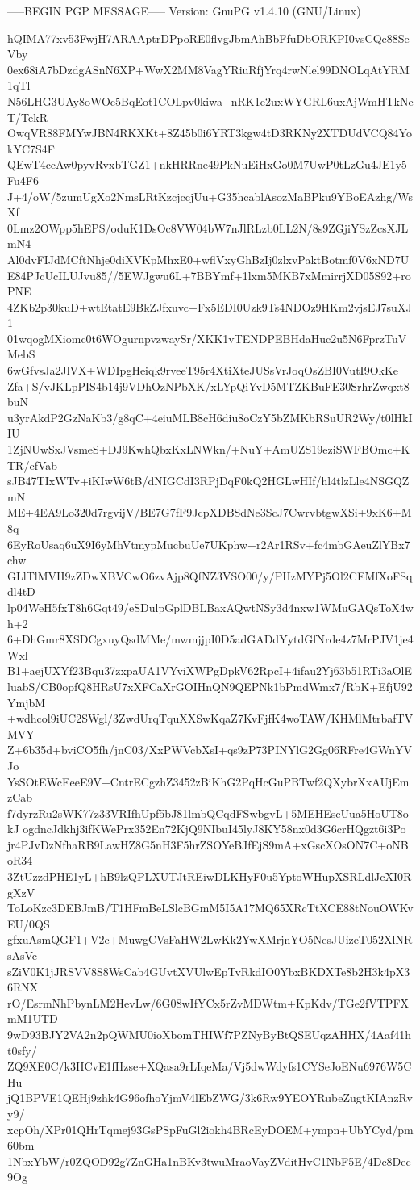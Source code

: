 -----BEGIN PGP MESSAGE-----
Version: GnuPG v1.4.10 (GNU/Linux)

hQIMA77xv53FwjH7ARAAptrDPpoRE0flvgJbmAhBbFfuDbORKPI0vsCQc88SeVby
0ex68iA7bDzdgASnN6XP+WwX2MM8VagYRiuRfjYrq4rwNlel99DNOLqAtYRM1qTl
N56LHG3UAy8oWOc5BqEot1COLpv0kiwa+nRK1e2uxWYGRL6uxAjWmHTkNeT/TekR
OwqVR88FMYwJBN4RKXKt+8Z45b0i6YRT3kgw4tD3RKNy2XTDUdVCQ84YokYC7S4F
QEwT4ccAw0pyvRvxbTGZ1+nkHRRne49PkNuEiHxGo0M7UwP0tLzGu4JE1y5Fu4F6
J+4/oW/5zumUgXo2NmsLRtKzcjccjUu+G35hcablAsozMaBPku9YBoEAzhg/WsXf
0Lmz2OWpp5hEPS/oduK1DsOc8VW04bW7nJlRLzb0LL2N/8s9ZGjiYSzZcsXJLmN4
Al0dvFIJdMCftNhje0diXVKpMhxE0+wflVxyGhBzIj0zlxvPaktBotmf0V6xND7U
E84PJcUcILUJvu85//5EWJgwu6L+7BBYmf+1lxm5MKB7xMmirrjXD05S92+roPNE
4ZKb2p30kuD+wtEtatE9BkZJfxuvc+Fx5EDI0Uzk9Ts4NDOz9HKm2vjsEJ7suXJ1
01wqogMXiomc0t6WOgurnpvzwaySr/XKK1vTENDPEBHdaHuc2u5N6FprzTuVMebS
6wGfvsJa2JlVX+WDIpgHeiqk9rveeT95r4XtiXteJUSsVrJoqOsZBI0VutI9OkKe
Zfa+S/vJKLpPIS4b14j9VDhOzNPbXK/xLYpQiYvD5MTZKBuFE30SrhrZwqxt8buN
u3yrAkdP2GzNaKb3/g8qC+4eiuMLB8cH6diu8oCzY5bZMKbRSuUR2Wy/t0lHkIIU
1ZjNUwSxJVsmeS+DJ9KwhQbxKxLNWkn/+NuY+AmUZS19eziSWFBOmc+KTR/cfVab
sJB47TIxWTv+iKIwW6tB/dNIGCdI3RPjDqF0kQ2HGLwHIf/hl4tlzLle4NSGQZmN
ME+4EA9Lo320d7rgvijV/BE7G7fF9JcpXDBSdNe3ScJ7CwrvbtgwXSi+9xK6+M8q
6EyRoUsaq6uX9I6yMhVtmypMucbuUe7UKphw+r2Ar1RSv+fc4mbGAeuZlYBx7chw
GLlTlMVH9zZDwXBVCwO6zvAjp8QfNZ3VSO00/y/PHzMYPj5Ol2CEMfXoFSqdl4tD
lp04WeH5fxT8h6Gqt49/eSDulpGplDBLBaxAQwtNSy3d4nxw1WMuGAQsToX4wh+2
6+DhGmr8XSDCgxuyQsdMMe/mwmjjpI0D5adGADdYytdGfNrde4z7MrPJV1je4Wxl
B1+aejUXYf23Bqu37zxpaUA1VYviXWPgDpkV62RpcI+4ifau2Yj63b51RTi3aOlE
luabS/CB0opfQ8HRsU7xXFCaXrGOIHnQN9QEPNk1bPmdWmx7/RbK+EfjU92YmjbM
+wdhcol9iUC2SWgl/3ZwdUrqTquXXSwKqaZ7KvFjfK4woTAW/KHMlMtrbafTVMVY
Z+6b35d+bviCO5fh/jnC03/XxPWVcbXsI+qs9zP73PINYlG2Gg06RFre4GWnYVJo
YsSOtEWcEeeE9V+CntrECgzhZ3452zBiKhG2PqHcGuPBTwf2QXybrXxAUjEmzCab
f7dyrzRu2sWK77z33VRIfhUpf5bJ81lmbQCqdFSwbgvL+5MEHEscUua5HoUT8okJ
ogdncJdkhj3ifKWePrx352En72KjQ9NIbuI45lyJ8KY58nx0d3G6crHQgzt6i3Po
jr4PJvDzNfhaRB9LawHZ8G5nH3F5hrZSOYeBJfEjS9mA+xGscXOsON7C+oNBoR34
3ZtUzzdPHE1yL+hB9lzQPLXUTJtREiwDLKHyF0u5YptoWHupXSRLdlJcXI0RgXzV
ToLoKzc3DEBJmB/T1HFmBeLSlcBGmM5I5A17MQ65XRcTtXCE88tNouOWKvEU/0QS
gfxuAsmQGF1+V2c+MuwgCVsFaHW2LwKk2YwXMrjnYO5NesJUizeT052XlNRsAsVc
sZiV0K1jJRSVV8S8WsCab4GUvtXVUlwEpTvRkdIO0YbxBKDXTe8b2H3k4pX36RNX
rO/EsrmNhPbynLM2HevLw/6G08wIfYCx5rZvMDWtm+KpKdv/TGe2fVTPFXmM1UTD
9wD93BJY2VA2n2pQWMU0ioXbomTHIWf7PZNyByBtQSEUqzAHHX/4Aaf41ht0sfy/
ZQ9XE0C/k3HCvE1fHzse+XQasa9rLIqeMa/Vj5dwWdyfs1CYSeJoENu6976W5CHu
jQ1BPVE1QEHj9zhk4G96ofhoYjmV4lEbZWG/3k6Rw9YEOYRubeZugtKIAnzRvy9/
xcpOh/XPr01QHrTqmej93GsPSpFuGl2iokh4BRcEyDOEM+ympn+UbYCyd/pm60bm
1NbxYbW/r0ZQOD92g7ZnGHa1nBKv3twuMraoVayZVditHvC1NbF5E/4Dc8Dec9Og
